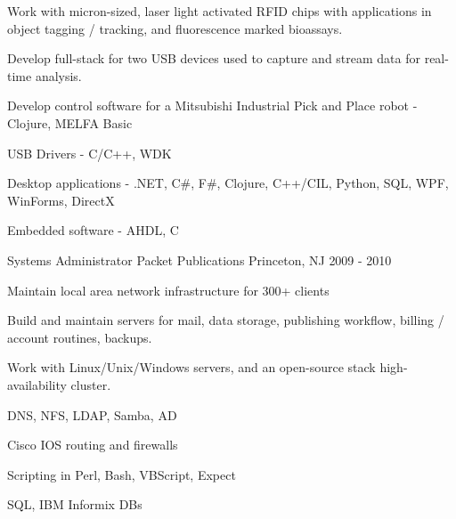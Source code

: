 \documentclass[11pt, letterpaper]{awesome-cv}
\begin{document}
\begin{cventries}
{\begin{cvitems}
        \item {Work with micron-sized, laser light activated RFID chips with applications in object tagging / tracking, and fluorescence marked bioassays.}
        \item {Develop full-stack for two USB devices used to capture and stream data for real-time analysis.}
        \item {Develop control software for a Mitsubishi Industrial Pick and Place robot - Clojure, MELFA Basic}
        \item {USB Drivers - C/C++, WDK}
        \item {Desktop applications - .NET, C\#, F\#, Clojure, C++/CIL, Python, SQL, WPF, WinForms, DirectX}
        \item {Embedded software - AHDL, C}
      \end{cvitems}
    }

  \cventry
    {Systems Administrator} %
    {Packet Publications} %
    {Princeton, NJ} %
    {2009 - 2010} %
    {
      \begin{cvitems} %
        \item {Maintain local area network infrastructure for 300+ clients}
        \item {Build and maintain servers for mail, data storage, publishing workflow, billing / account routines, backups.}
        \item {Work with Linux/Unix/Windows servers, and an open-source stack high-availability cluster.}
        \item {DNS, NFS, LDAP, Samba, AD}
        \item {Cisco IOS routing and firewalls}
        \item {Scripting in Perl, Bash, VBScript, Expect}
        \item {SQL, IBM Informix DBs}
      \end{cvitems}
    }

\end{cventries}
\end{document}
